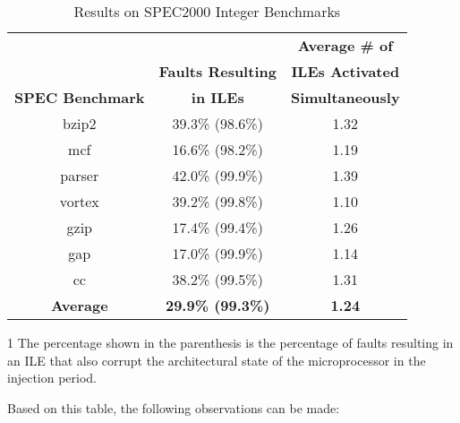 \documentclass[12pt]{yalephd}
\begin{document}
\begin{table}[!ht]
\caption{Results on SPEC2000 Integer Benchmarks}\label{sC2SPEC_stats}
\begin{center}
\begin{threeparttable}[b]
\begin{tabular}{||c|c|c||}
\hline
\hline
{\bf } & {\bf }  &\bf{Average \# of} \\
{\bf } & {\bf Faults Resulting}  &\bf{ILEs Activated} \\
{\bf SPEC Benchmark} & {\bf in ILEs\tnote{1}}  & \bf{Simultaneously} \\
\hline
bzip2 & 39.3\% (98.6\%) &  1.32 \\
\hline
mcf & 16.6\% (98.2\%) &  1.19 \\
\hline
parser & 42.0\% (99.9\%) &  1.39 \\
\hline
vortex & 39.2\% (99.8\%) &  1.10 \\
\hline
gzip & 17.4\% (99.4\%) &  1.26 \\
\hline
gap & 17.0\% (99.9\%) &  1.14 \\
\hline
cc & 38.2\% (99.5\%) &  1.31 \\
\hline
\hline
{\bf Average} & {\bf 29.9\% (99.3\%)} &  {\bf 1.24}  \\
\hline
\hline
\end{tabular}
  \begin{tablenotes}
    \item[1] The percentage shown in the parenthesis is the percentage of faults resulting in an ILE that also corrupt the architectural state of the microprocessor in the injection period.
  \end{tablenotes}
\end{threeparttable}
\end{center}
\end{table}

Based on this table, the following observations can be made:
\end{document}
